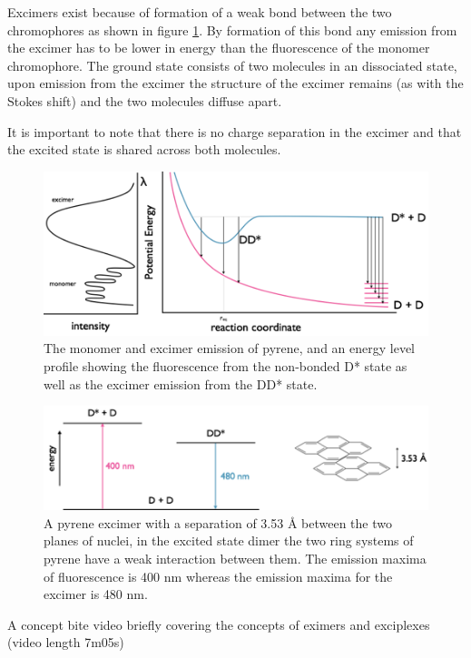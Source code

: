 \documentclass[
]{book}
\begin{document}
Excimers exist because of formation of a weak bond between the two chromophores as shown in figure \ref{fig:excimer}. By formation of this bond any emission from the excimer has to be lower in energy than the fluorescence of the monomer chromophore. The ground state consists of two molecules in an dissociated state, upon emission from the excimer the structure of the excimer remains (as with the Stokes shift) and the two molecules diffuse apart.

It is important to note that there is no charge separation in the excimer and that the excited state is shared across both molecules.

\begin{figure}

{\centering \includegraphics[width=0.7\linewidth]{images/excimer} 

}

\caption{The monomer and excimer emission of pyrene, and an energy level profile showing the fluorescence from the non-bonded D* state as well as the excimer emission from the DD* state.}\label{fig:excimer}
\end{figure}

\begin{figure}

{\centering \includegraphics[width=0.7\linewidth]{images/pyreneexcimer} 

}

\caption{A pyrene excimer with a separation of 3.53 Å between the two planes of nuclei, in the excited state dimer the two ring systems of pyrene have a weak interaction between them. The emission maxima of fluorescence is 400 nm whereas the emission maxima for the excimer is 480 nm.}\label{fig:pyreneexcimer}
\end{figure}

A concept bite video briefly covering the concepts of eximers and exciplexes (video length 7m05s)
\end{document}
